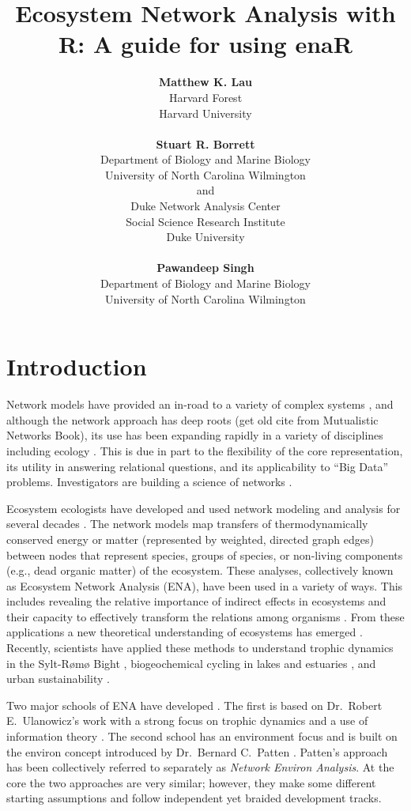 \documentclass[article]{jss}
\author{
  \textbf{Matthew K. Lau}\\Harvard Forest\\Harvard University\\
  \\
  \textbf{Stuart R. Borrett}\\Department of Biology and Marine Biology\\
  University of North Carolina Wilmington\\and\\Duke Network
  Analysis Center\\Social Science Research Institute\\Duke
  University\\
  \\
  \textbf{Pawandeep Singh}\\Department of Biology and Marine Biology\\
  University of North Carolina Wilmington\\}
\title{Ecosystem Network Analysis with R: A guide for using enaR}
\begin{document}


\section[Introduction]{Introduction}
Network models have provided an in-road to a variety of complex
systems \citep{watts1998collective, newman01scientific1, barabasi12,
  newman06structure, wasserman1994}, and although the network approach
has deep roots \citep{newman06structure} {\color{red} (get old cite
  from Mutualistic Networks Book)}, its use has been expanding rapidly
in a variety of disciplines including ecology \citep{borrett14_rise,
  ings2009}.  This is due in part to the flexibility of the core
representation, its utility in answering relational questions, and its
applicability to ``Big Data'' problems.  Investigators are building
a science of networks \citep{nrc06network, brandes13}.


Ecosystem ecologists have developed and used network modeling and
analysis for several decades \citep{borrett12_netecol, ulanowicz86,
  fath99_review}.  The network models map transfers of
thermodynamically conserved energy or matter (represented by weighted,
directed graph edges) between nodes that represent species, groups of
species, or non-living components (e.g., dead organic matter) of the
ecosystem.  These analyses, collectively known as Ecosystem Network
Analysis (ENA), have been used in a variety of ways.  This includes
revealing the relative importance of indirect effects in ecosystems
\citep{patten83, higashi89, salas11_did} and their capacity to
effectively transform the relations among organisms
\citep{ulanowicz90, patten91, fath98, bondavalli99}.  From these
applications a new theoretical understanding of ecosystems has emerged
\citep{higashi91, belgrano05, jorgensen07_newecology}.  Recently,
scientists have applied these methods to understand trophic
dynamics in the Sylt-R{\o}m{\o} Bight
\citep{baird04_sylt,baird08_sylt}, biogeochemical cycling in lakes and
estuaries \citep{christian03, small2014, hines15}, and urban
sustainability \citep{zhang10, chen12}.

Two major schools of ENA have developed \citep{scharler09comparing}.
The first is based on Dr.\ Robert E.\ Ulanowicz's work with a strong
focus on trophic dynamics and a use of information theory
\citep{ulanowicz86, ulanowicz97, ulanowicz04}.  The second school has
an environment focus and is built on the environ concept introduced by
Dr.\ Bernard C.\ Patten \citep{patten76, patten78, fath99_review}.
Patten's approach has been collectively referred to separately as
\emph{Network Environ Analysis}. At the core the two approaches are
very similar; however, they make some different starting assumptions
and follow independent yet braided development tracks.
\end{document}

